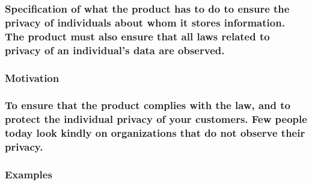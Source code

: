 \documentclass[
]{article}
\begin{document}
\hypertarget{specification-of-what-the-product-has-to-do-to-ensure-the-privacy-of-individuals-about-whom-it-stores-information.-the-product-must-also-ensure-that-all-laws-related-to-privacy-of-an-individuals-data-are-observed.}{%
\subsubsection{\texorpdfstring{Specification of what the product has to
do to ensure the privacy of individuals about whom it stores
information. The product must also ensure that all laws related to
privacy of an individual's data are observed.
}{Specification of what the product has to do to ensure the privacy of individuals about whom it stores information. The product must also ensure that all laws related to privacy of an individual's data are observed. }}\label{specification-of-what-the-product-has-to-do-to-ensure-the-privacy-of-individuals-about-whom-it-stores-information.-the-product-must-also-ensure-that-all-laws-related-to-privacy-of-an-individuals-data-are-observed.}}

\hypertarget{motivation-53}{%
\subsubsection{Motivation}\label{motivation-53}}

\hypertarget{to-ensure-that-the-product-complies-with-the-law-and-to-protect-the-individual-privacy-of-your-customers.-few-people-today-look-kindly-on-organizations-that-do-not-observe-their-privacy.}{%
\subsubsection{\texorpdfstring{To ensure that the product complies with
the law, and to protect the individual privacy of your customers. Few
people today look kindly on organizations that do not observe their
privacy.
}{To ensure that the product complies with the law, and to protect the individual privacy of your customers. Few people today look kindly on organizations that do not observe their privacy. }}\label{to-ensure-that-the-product-complies-with-the-law-and-to-protect-the-individual-privacy-of-your-customers.-few-people-today-look-kindly-on-organizations-that-do-not-observe-their-privacy.}}

\hypertarget{examples-37}{%
\subsubsection{Examples}\label{examples-37}}
\end{document}
